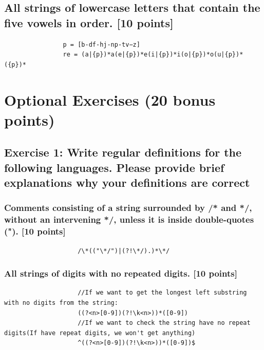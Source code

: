 \documentclass{article}
\begin{document}
        \subsection{All strings of lowercase letters that contain the five vowels in order. [10 points]}
            \begin{lstlisting}
                p = [b-df-hj-np-tv−z]
                re = (a|{p})*a(e|{p})*e(i|{p})*i(o|{p})*o(u|{p})*({p})*
            \end{lstlisting}
    \section{Optional Exercises (20 bonus points)}
        \subsection{Exercise 1: Write regular definitions for the following languages. Please provide brief
        explanations why your definitions are correct}
            \subsubsection{Comments consisting of a string surrounded by /* and */, without an intervening */, unless it is
            inside double-quotes ("). [10 points]}
                \begin{lstlisting}
                    /\*(("\*/")|(?!\*/).)*\*/
                \end{lstlisting}
            \subsubsection{All strings of digits with no repeated digits. [10 points]}
                \begin{lstlisting}
                    //If we want to get the longest left substring with no digits from the string:
                    ((?<n>[0-9])(?!\k<n>))*([0-9])
                    //If we want to check the string have no repeat digits(If have repeat digits, we won't get anything)
                    ^((?<n>[0-9])(?!\k<n>))*([0-9])$
                \end{lstlisting}
\end{document}
